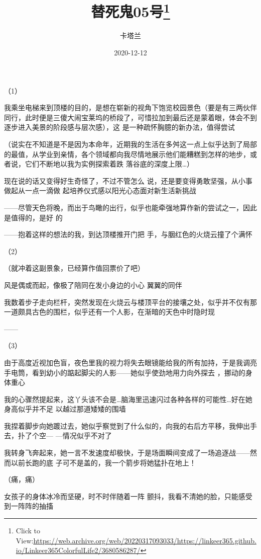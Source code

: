 \documentclass{article}
\title{替死鬼05号\footnote{Click to View:\url{https://web.archive.org/web/20220317093033/https://linkeer365.github.io/Linkeer365ColorfulLife2/3680586287/}}}
\author{卡塔兰}
\date{2020-12-12}
\begin{document}

\maketitle


\Large


﻿（1） 

我乘坐电梯来到顶楼的目的，是想在崭新的视角下饱览校园景色（要是有三两伙伴同行，此时便是三傻大闹宝莱坞的桥段了，可惜拉加到最后还是蒙着眼，体会不到逐步进入美景的阶段感与层次感），这
是一种疏怀胸臆的新办法，值得尝试 

（说实在不知道是不是因为本命年，近期我的生活在多舛这一点上似乎达到了局部的最值，从学业到亲情，各个领域都向我尽情地展示他们能糟糕到怎样的地步，或者说，它们不断地以我为实例探索着跌
落谷底的深度上限…） 

现在说的话又变得好生奇怪了，不过不管怎么
\newpage
说，还是要变得勇敢坚强，从小事做起从一点一滴做
起培养仪式感以阳光心态面对新生活新挑战 

——尽管天色将晚，而出于鸟瞰的出行，似乎也能牵强地算作新的尝试之一，因此是值得的，是好
的 

——抱着这样的想法的我，到达顶楼推开门把
手，与胭红色的火烧云撞了个满怀 


（2） 

（就冲着这副景象，已经算作值回票价了吧）
 

风是偶或而起，像极了陪同在发小身边的小心
翼翼的同伴 

我数着步子走向栏杆，突然发现在火烧云与楼顶平台的接壤之处，似乎并不仅有那一道颇具古色的围栏，似乎还有一个人影，在渐暗的天色中时隐时现
\newpage

—— 


（3） 

由于高度近视加色盲，夜色里我的视力将失去眼镜能给我的所有加持，于是我调亮手电筒，看到幼小的踮起脚尖的人影——她似乎使劲地用力向外探去
，挪动的身体重心 

我的心骤然提起来，这丫头该不会是…脑海里迅速闪过各种各样的可能性…好在她身高似乎并不足
以越过那道矮矮的围墙 

我捏着脚步向她踱过去，她似乎察觉到了什么似的，向我的右后方平移，我伸出手去，扑了个空—
—情况似乎不对了 

我转身飞奔起来，她一言不发速度却极快，于是场面瞬间变成了一场追逐战——然而以前长跑的底
子可不是盖的，我一个箭步将她猛扑在地上！ 

\newpage


（痛，痛） 

女孩子的身体冰冷而坚硬，时不时伴随着一阵
颤抖，我看不清她的脸，只能感受到一阵阵的抽搐 
\end{document}

